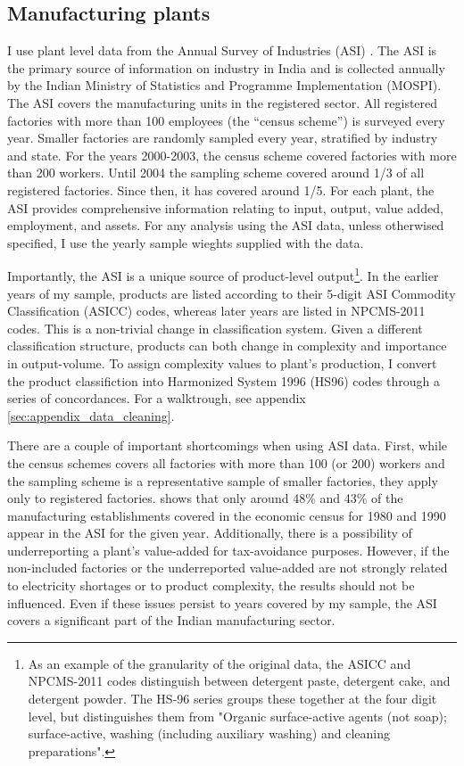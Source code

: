 \documentclass[11pt]{article}
\begin{document}
\subsection{Manufacturing plants}%
\label{sub:plant_data}
I use plant level data from the Annual Survey of Industries (ASI) \citep{mospi_annual_2000-1}. The ASI is the primary source of information on industry in India and is collected annually by the Indian Ministry of Statistics and Programme Implementation (MOSPI). The ASI covers the manufacturing units in the registered sector. All registered factories with more than 100 employees (the ``census scheme'') is surveyed every year. Smaller factories are randomly sampled every year, stratified by industry and state. For the years 2000-2003, the census scheme covered factories with more than 200 workers. Until 2004 the sampling scheme covered around 1/3 of all registered factories. Since then, it has covered around 1/5. For each plant, the ASI provides comprehensive information relating to input, output, value added, employment, and assets. For any analysis using the ASI data, unless otherwised specified, I use the yearly sample wieghts supplied with the data.

Importantly, the ASI is a unique source of product-level output\footnote{As an example of the granularity of the original data, the ASICC and NPCMS-2011 codes distinguish between detergent paste, detergent cake, and detergent powder. The HS-96 series groups these together at the four digit level, but distinguishes them from "Organic surface-active agents (not soap); surface-active, washing (including auxiliary washing) and cleaning preparations".}. In the earlier years of my sample, products are listed according to their 5-digit ASI Commodity Classification (ASICC) codes, whereas later years are listed in NPCMS-2011 codes. This is a non-trivial change in classification system. Given a different classification structure, products can both change in complexity and importance in output-volume. To assign complexity values to plant's production, I convert the product classifiction into Harmonized System 1996 (HS96) codes through a series of concordances. For a walktrough, see appendix \ref{sec:appendix_data_cleaning}.

There are a couple of important shortcomings when using ASI data. First, while the census schemes covers all factories with more than 100 (or 200) workers and the sampling scheme is a representative sample of smaller factories, they apply only to registered factories. \cite{nagaraj_how_2002} shows that only around 48\% and 43\% of the manufacturing establishments covered in the economic census for 1980 and 1990 appear in the ASI for the given year. Additionally, there is a possibility of underreporting a plant's value-added for tax-avoidance purposes. However, if the non-included factories or the underreported value-added are not strongly related to electricity shortages or to product complexity, the results should not be influenced. Even if these issues persist to years covered by my sample, the ASI covers a significant part of the Indian manufacturing sector.
\end{document}
